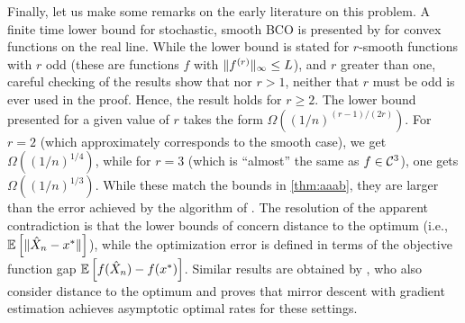 Finally, let us make some remarks on the early literature on this problem.
A finite time lower bound for stochastic, smooth BCO is presented by  \citet{Chen88:LB-AoS} for
convex functions on the real line.
While the lower bound is stated for $r$-smooth functions with $r$ odd (these are functions $f$ with $\|f^{(r)}\|_{\infty}\le L$), and $r$ greater than one, careful checking of the results show that nor $r>1$, neither that $r$ must be odd is ever used in the proof.
Hence, the result holds for $r\ge 2$.
The lower bound presented for a given value of $r$ takes the form $\Omega( (1/n)^{ (r-1)/(2r)} )$. For $r=2$ (which approximately corresponds to the smooth case), we get $\Omega((1/n)^{1/4})$, while for $r=3$ (which is ``almost'' the same as $f\in \mathcal{C}^3$), one gets $\Omega((1/n)^{1/3})$.
While these match the bounds in \cref{thm:aaab}, they are larger than the error achieved by
the algorithm of \cite{liang2014zeroth}. The resolution of the apparent contradiction is that the lower bounds of \citet{Chen88:LB-AoS} concern distance to the optimum (i.e., $\mathbb{E}\left[ \|\hat{X}_n - x^* \|\right]$), while the optimization error is defined in terms of the objective function gap $\mathbb{E}\left[ f(\hat{X}_n) -f( x^*)\right]$.
Similar results are obtained by \citet{PoTsy90}, who also consider distance to the optimum and proves that mirror descent with gradient estimation achieves asymptotic optimal rates for these settings.


